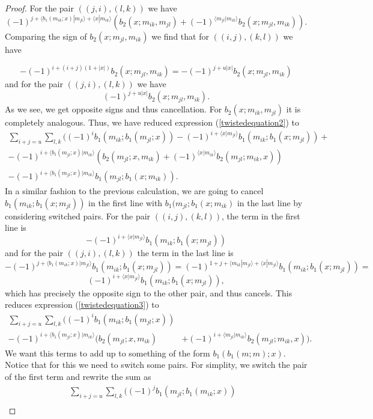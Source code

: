 \documentclass[twoside]{article}
\begin{document}
\begin{appendices}
\begin{proof}
For the pair $((j,i),(l,k))$ we have
\[(-1)^{j+\langle b_1(m_{ik};x)|m_{jl}\rangle+\langle x|m_{ik}\rangle}(b_2(x;m_{ik},m_{jl})+(-1)^{\langle m_{jl}|m_{ik}\rangle}b_2(x;m_{jl},m_{ik})).\]
 Comparing the sign of $b_2(x;m_{jl},m_{ik})$ we find that for $((i,j),(k,l))$ we have

\[-(-1)^{i+(i+j)(1+|x|)}b_2(x;m_{jl},m_{ik})=-(-1)^{j+u|x|}b_2(x;m_{jl},m_{ik})\]
and for the pair $((j,i),(l,k))$ we have
\[(-1)^{j+u|x|}b_2(x;m_{jl},m_{ik}).\]
As we see, we get opposite signs and thus cancellation. For $b_2(x;m_{ik},m_{jl})$ it is completely analogous. Thus, we have reduced expression (\ref{twistedequation2}) to
\begin{align}
\sum_{i+j=u}\sum_{l,k}((-1)^ib_1(m_{ik}; b_1(m_{jl};x))-(-1)^{i+\langle x|m_{jl}\rangle}b_1(m_{ik};b_1(x;m_{jl}))+\nonumber\\
 -(-1)^{i+\langle b_1(m_{jl};x)|m_{ik}\rangle}(b_2(m_{jl};x,m_{ik})+(-1)^{\langle x|m_{ik}\rangle}b_2(m_{jl};m_{ik},x))\label{twistedequation3}\\
 -(-1)^{i+\langle b_1(m_{jl};x)|m_{ik}\rangle}b_1(m_{jl};b_1(x;m_{ik})).\nonumber
\end{align}
In a similar fashion to the previous calculation, we are going to cancel $b_1(m_{ik};b_1(x;m_{jl}))$ in the first line with $b_1(m_{jl};b_1(x;m_{ik})$ in the last line by considering switched pairs. For the pair $((i,j),(k,l))$, the term in the first line is 
\[-(-1)^{i+\langle x|m_{jl}\rangle}b_1(m_{ik};b_1(x;m_{jl}))\]
and for the pair $((j,i),(l,k))$ the term in the last line is
\[-(-1)^{j+\langle b_1(m_{ik};x)|m_{jl}\rangle}b_1(m_{ik};b_1(x;m_{jl}))=(-1)^{1+j+\langle m_{ik}|m_{jl}\rangle+\langle x|m_{jl}\rangle}b_1(m_{ik};b_1(x;m_{jl}))=\]
\[(-1)^{i+\langle x|m_{jl}\rangle}b_1(m_{ik};b_1(x;m_{jl})),\]
which has precisely the opposite sign to the other pair, and thus cancels. This reduces expression (\ref{twistedequation3}) to 
\begin{align}
\sum_{i+j=u}\sum_{l,k}((-1)^ib_1(m_{ik}; b_1(m_{jl};x))&\label{twistedequation4}\\
 -(-1)^{i+\langle b_1(m_{jl};x)|m_{ik}\rangle}(b_2(m_{jl};x,m_{ik})&+(-1)^{i+\langle m_{jl}|m_{ik}\rangle}b_2(m_{jl};m_{ik},x)).\nonumber
\end{align}
We want this terms to add up to something of the form $b_1(b_1(m;m);x)$. Notice that for this we need to switch some pairs. For simplity, we switch the pair of the first term and rewrite the sum as
\begin{align}
\sum_{i+j=u}\sum_{l,k}((-1)^jb_1(m_{jl}; b_1(m_{ik};x))&\\

\end{align}
\end{proof}
\end{appendices}
\end{document}
